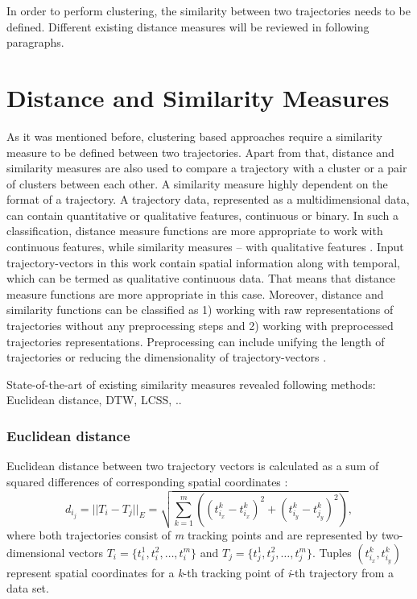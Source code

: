 In order to perform clustering, the similarity between two trajectories needs to be defined. Different existing distance measures will be reviewed in following paragraphs.

\section{Distance and Similarity Measures}
As it was mentioned before, clustering based approaches require a similarity measure to be defined between two trajectories. Apart from that, distance and similarity measures are also used to compare a trajectory with a cluster or a pair of clusters between each other. A similarity measure highly dependent on the format of a trajectory. A trajectory data, represented as a multidimensional data, can contain quantitative or qualitative features, continuous or binary. In such a classification, distance measure functions are more appropriate to work with continuous features, while similarity measures – with qualitative features \cite{article:23_survey_ca}. Input trajectory-vectors in this work contain spatial information along with temporal, which can be termed as qualitative continuous data. That means that distance measure functions are more appropriate in this case. Moreover, distance and similarity functions can be classified as 1) working with raw representations of trajectories without any preprocessing steps and 2) working with preprocessed trajectories representations. Preprocessing can include unifying the length of trajectories or reducing the dimensionality of trajectory-vectors \cite{inproceedings:7_related_work}. 

State-of-the-art of existing similarity measures revealed following methods: Euclidean distance, DTW, LCSS, ..

\subsubsection{Euclidean distance}
Euclidean distance between two trajectory vectors is calculated as a sum of squared differences of corresponding spatial coordinates \cite{article:27_vna_cad_td}:
\begin{equation}
	d_i_j = ||T_i - T_j||_E = \sqrt{\sum_{k=1}^{m}((t_{i_x}^k - t_{i_x}^k)^2 + (t_{i_y}^k - t_{j_y}^k)^2)},
\end{equation}
where both trajectories consist of \textit{m} tracking points and are represented by two-dimensional vectors $T_i = \{t_i^1, t_i^2, \ldots, t_i^m\}$ and $T_j = \{t_j^1, t_j^2, \ldots, t_j^m\}$. Tuples $(t_{i_x}^k, t_{i_y}^k)$ represent spatial coordinates for a \textit{k}-th tracking point of \textit{i}-th trajectory from a data set.

